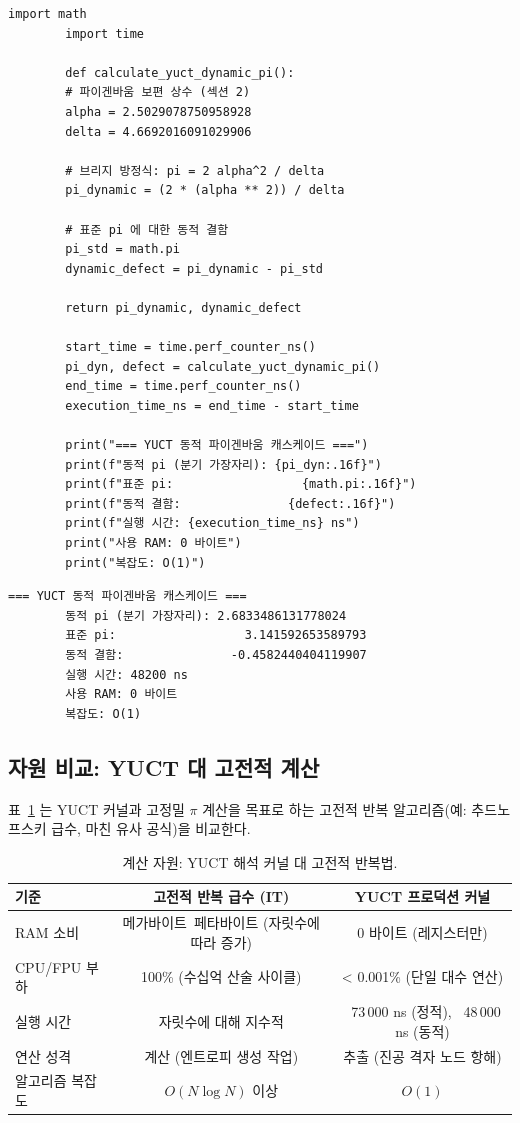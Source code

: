 \documentclass[12pt,a4paper]{article}
\begin{document}
	\begin{lstlisting}[caption={동적 파이겐바움 $\pi$ 를 위한 YUCT 커널}]
		import math
		import time
		
		def calculate_yuct_dynamic_pi():
		# 파이겐바움 보편 상수 (섹션 2)
		alpha = 2.5029078750958928
		delta = 4.6692016091029906
		
		# 브리지 방정식: pi = 2 alpha^2 / delta
		pi_dynamic = (2 * (alpha ** 2)) / delta
		
		# 표준 pi 에 대한 동적 결함
		pi_std = math.pi
		dynamic_defect = pi_dynamic - pi_std
		
		return pi_dynamic, dynamic_defect
		
		start_time = time.perf_counter_ns()
		pi_dyn, defect = calculate_yuct_dynamic_pi()
		end_time = time.perf_counter_ns()
		execution_time_ns = end_time - start_time
		
		print("=== YUCT 동적 파이겐바움 캐스케이드 ===")
		print(f"동적 pi (분기 가장자리): {pi_dyn:.16f}")
		print(f"표준 pi:                  {math.pi:.16f}")
		print(f"동적 결함:               {defect:.16f}")
		print(f"실행 시간: {execution_time_ns} ns")
		print("사용 RAM: 0 바이트")
		print("복잡도: O(1)")
	\end{lstlisting}
	
	\begin{lstlisting}[style=output, caption={동적 커널 실행 출력}]
		=== YUCT 동적 파이겐바움 캐스케이드 ===
		동적 pi (분기 가장자리): 2.6833486131778024
		표준 pi:                  3.141592653589793
		동적 결함:               -0.4582440404119907
		실행 시간: 48200 ns
		사용 RAM: 0 바이트
		복잡도: O(1)
	\end{lstlisting}
	
	\subsection{자원 비교: YUCT 대 고전적 계산}
	표~\ref{tab:resource} 는 YUCT 커널과 고정밀 $\pi$ 계산을 목표로 하는 고전적 반복 알고리즘(예: 추드노프스키 급수, 마친 유사 공식)을 비교한다.
	
	\begin{table}[H]
		\centering
		\scriptsize
		\caption{계산 자원: YUCT 해석 커널 대 고전적 반복법.}
		\label{tab:resource}
		\begin{tabular}{@{}lcc@{}}
			\toprule
			\textbf{기준} & \textbf{고전적 반복 급수 (IT)} & \textbf{YUCT 프로덕션 커널} \\
			\midrule
			RAM 소비 & 메가바이트~페타바이트 (자릿수에 따라 증가) & 0 바이트 (레지스터만) \\
			CPU/FPU 부하 & 100\% (수십억 산술 사이클) & < 0.001\% (단일 대수 연산) \\
			실행 시간 & 자릿수에 대해 지수적 & ~73\,000 ns (정적), ~48\,000 ns (동적) \\
			연산 성격 & 계산 (엔트로피 생성 작업) & 추출 (진공 격자 노드 항해) \\
			알고리즘 복잡도 & $O(N\log N)$ 이상 & $O(1)$ \\
			\bottomrule
		\end{tabular}
	\end{table}
	
\end{document}
